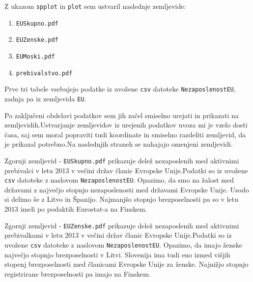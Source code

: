 \documentclass[11pt,a4paper]{article}
\begin{document}
Z ukazom \verb|spplot| in \verb|plot| sem ustvaril naslednje zemljevide: 
\begin{enumerate} 
\item{\verb|EUSkupno.pdf|}

\item{\verb|EUZenske.pdf|}

\item{\verb|EUMoski.pdf|}

\item{\verb|prebivalstvo.pdf|}
\end{enumerate}

Prve tri tabele vsebujejo podatke iz uvožene \verb|csv| datoteke \texttt{Ne\-za\-pos\-le\-nost\-EU}, zadnja pa iz zemljevida \verb|EU|. 

Po zaključeni obdelavi podatkov sem jih začel smiselno urejati in prikazati na zemljevidih.Ustvarjanje zemljevidov iz urejenih podatkov uvoza mi je vzelo dosti časa, saj sem moral popraviti tudi koordinate in smiselno razdeliti zemljevid, da je prikazal potrebno.Na naslednjih straneh se nahajajo omenjeni zemljevidi. 


Zgornji zemljevid - \verb|EUSkupno.pdf| prikazuje delež nezaposlenih med aktivnimi prebivalci v letu 2013 v večini držav članic Evropske Unije.Podatki so iz uvožene \verb|csv| datoteke z naslovom \verb|NezaposlenostEU|. Opazimo, da smo na žalost med državami z največjo stopnjo nezaposlenosti med državami Evropske Unije. Usodo si delimo še z Litvo in Španijo. Najmanjšo stopnjo brezposelnosti pa so v letu 2013 imeli po podaktih Eurostat-a na Finskem.


Zgornji zemljevid - \verb|EUZenske.pdf| prikazuje delež nezaposlenih med aktivnimi prebivalkami v letu 2013 v večini držav članic Evropske Unije.Podatki so iz uvožene \verb|csv| datoteke z naslovom \verb|NezaposlenostEU|. Opazimo, da imajo ženske največjo stopnjo brezposelnosti v Litvi. Slovenija ima tudi eno izmed višjih stopenj brezposelnosti med članicami Evropske Unije za ženske. Najnižjo stopnjo registrirane brezposelnosti pa imajo na Finskem.

\end{document}

